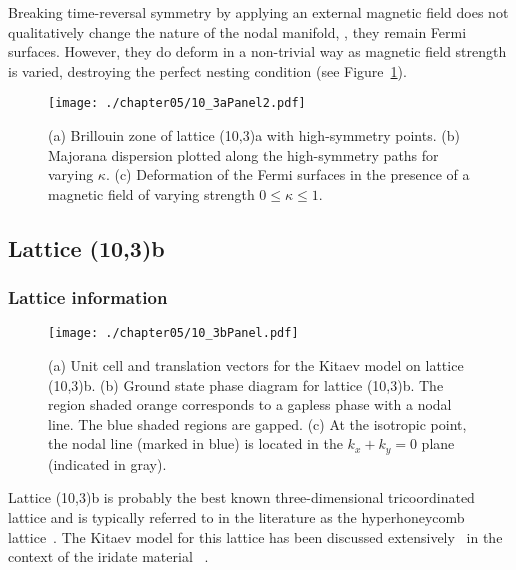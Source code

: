Breaking time-reversal symmetry by applying an external magnetic field does not qualitatively change the nature of the nodal manifold, \ie, they remain Fermi surfaces.
However, they do deform in a non-trivial way as magnetic field strength is varied, destroying the perfect nesting condition (see Figure~\ref{fig:chapter05_10_3aPanel2}).
%
\begin{figure}[tb]
	\centering
	\texttt{[image: ./chapter05/10\_3aPanel2.pdf]}
	\caption{
		(a) Brillouin zone of lattice (10,3)a with high-symmetry points.
		(b) Majorana dispersion plotted along the high-symmetry paths for varying $\kappa$.
		(c) Deformation of the Fermi surfaces in the presence of a magnetic field of varying strength $0 \leq \kappa \leq 1$.
	}
	\label{fig:chapter05_10_3aPanel2}
\end{figure}
%


%
%
\subsection{Lattice (10,3)b}
\label{section:chapter05_10_3b}
%
%
\subsubsection{Lattice information}
%
%
%
\begin{figure}[tb]
	\centering
	\texttt{[image: ./chapter05/10\_3bPanel.pdf]}
	\caption{
		(a) Unit cell and translation vectors for the Kitaev model on lattice (10,3)b.
		(b) Ground state phase diagram for lattice (10,3)b.
		The region shaded orange corresponds to a gapless phase with a nodal line.
		The blue shaded regions are gapped.
		(c) At the isotropic point, the nodal line (marked in blue) is located in the $k_x + k_y = 0$ plane (indicated in gray).
	}
	\label{fig:chapter05_10_3bPanel}
\end{figure}
%
Lattice (10,3)b is probably the best known three-dimensional tricoordinated lattice and is typically referred to in the literature as the hyperhoneycomb lattice~\cite{TakayamaPRL2015}.
The Kitaev model for this lattice has been discussed extensively~\cite{MandalPRB2009,HermannsPRB2014,LeePRB2014,KimchiPRB2014,NasuPRB2014} in the context of the iridate material \betaLithiumIridate~\cite{TakayamaPRL2015}.

